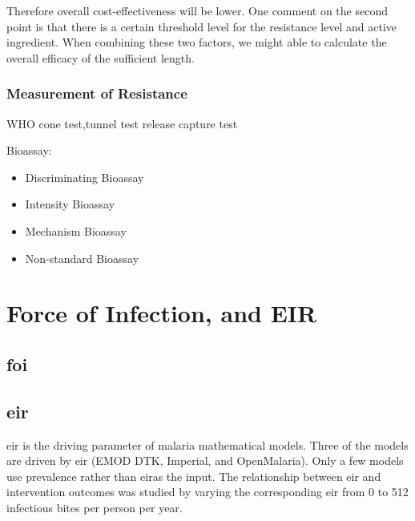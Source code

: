 \documentclass[a4paper, 12pt, twoside]{article}
\begin{document}

Therefore overall cost-effectiveness will be lower.  
One comment on the second point is that there is a certain threshold level for the resistance level and active ingredient.
When combining these two factors, we might able to calculate the overall efficacy of the sufficient length.

\subsubsection{Measurement of Resistance}
WHO cone test,tunnel test
release capture test

Bioassay:

\begin{itemize}
	\item Discriminating Bioassay
	\item Intensity Bioassay
	\item Mechanism Bioassay
	\item Non-standard Bioassay
\end{itemize}


\section{Force of Infection, and EIR}%
\label{sec:force_of_infection_and_eir}

\subsection{\texorpdfstring{\gls{foi}}{Force of Infection}}%
\label{sub:foi}

\subsection{\texorpdfstring{\gls{eir}}{EIR}}%
\label{sub:eir}
\gls{eir} is the driving parameter of malaria mathematical models.
Three of the models are driven by \gls{eir} (EMOD DTK, Imperial, and OpenMalaria).
Only a few models use prevalence rather than \gls{eir}as the input.
The relationship between \gls{eir} and intervention outcomes was studied by varying the corresponding \gls{eir} from 0 to 512 infectious bites per person per year.
\end{document}
